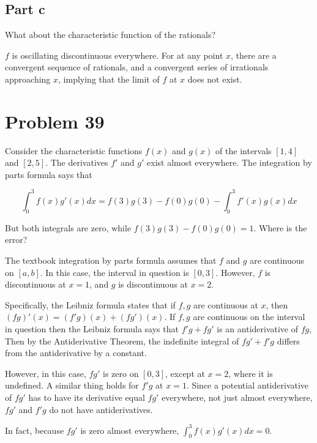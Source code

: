 \documentclass{article}
\begin{document}
\subsection*{Part c}

What about the characteristic function of the rationals?

$f$ is oscillating discontinuous everywhere. For at any point $x$, there are a convergent sequence of rationals, and a convergent series of irrationals approaching $x$, implying that the limit of $f$ at $x$ does not exist.

\section*{Problem 39}

Consider the characteristic functions $f(x)$ and $g(x)$ of the intervals $[1, 4]$ and $[2, 5]$. The derivatives $f'$ and $g'$ exist almost everywhere. The integration by parts formula says that

\[
\int_0^3 f(x)g'(x) dx = f(3)g(3) - f(0)g(0) - \int_0^3 f'(x)g(x)dx
\]

But both integrals are zero, while $f(3)g(3) - f(0)g(0) = 1$. Where is the error?

The textbook integration by parts formula assumes that $f$ and $g$ are continuous on $[a, b]$. In this case, the interval in question is $[0, 3]$. However, $f$ is discontinuous at $x=1$, and $g$ is discontinuous at $x = 2$.

Specifically, the Leibniz formula states that if $f, g$ are continuous at $x$, then $(fg)'(x) = (f'g)(x) + (fg')(x)$. If $f, g$ are continuous on the interval in question then the Leibniz formula says that $f'g + fg'$ is an antiderivative of $fg$, Then by the Antiderivative Theorem, the indefinite integral of $fg' + f'g$ differs from the antiderivative by a constant.

However, in this case, $fg'$ is zero on $[0, 3]$, except at $x=2$, where it is undefined. A similar thing holds for $f'g$ at $x=1$. Since a potential antiderivative of $fg'$ has to have its derivative equal $fg'$ everywhere, not just almost everywhere, $fg'$ and $f'g$ do not have antiderivatives.

In fact, because $fg'$ is zero almost everywhere, $\int_0^3 f(x)g'(x) dx = 0$.
\end{document}
